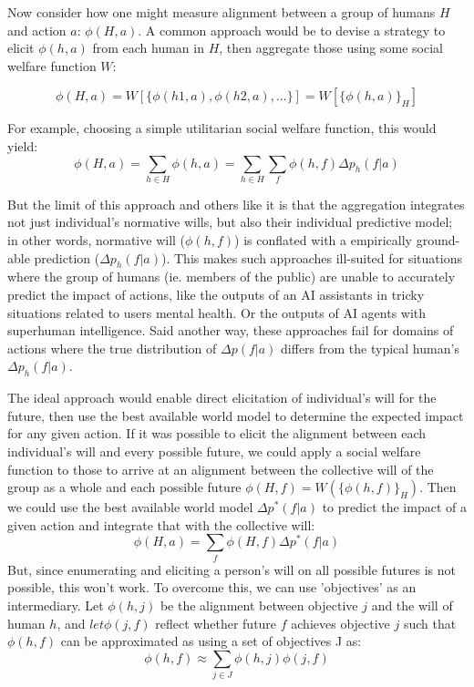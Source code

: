 \documentclass{article}
\begin{document}
Now consider how one might measure alignment between a group of humans $H$ and action $a$: $\phi(H,a)$. A common approach would be to devise a strategy to elicit $\phi(h,a)$ from each human in $H$, then aggregate those using some social welfare function $W$:

\begin{equation}
    \phi(H,a) = W[\{\phi(h1,a),\phi(h2,a),...\}] =W[\{\phi(h,a)\}_H]
\end{equation}

For example, choosing a simple utilitarian social welfare function, this would yield:
\begin{equation}
    \phi(H,a) = \sum\limits_{h\in H} \phi(h,a) = \sum\limits_{h\in H} \sum \limits_{f}\phi(h,f)\Delta p_h(f|a) 
\end{equation}

But the limit of this approach and others like it is that the aggregation integrates not just individual's normative wills, but also their individual predictive model; in other words, normative will ($\phi(h,f)$) is conflated with a empirically ground-able prediction ($\Delta p_h(f|a)$). This makes such approaches ill-suited for situations where the group of humans (ie. members of the public) are unable to accurately predict the impact of actions, like the outputs of an AI assistants in tricky situations related to users mental health. Or the outputs of AI agents with superhuman intelligence. Said another way, these approaches fail for domains of actions where the true distribution of $\Delta p(f|a)$ differs from the typical human's $\Delta p_h(f|a)$.

The ideal approach would enable direct elicitation of individual's will for the future, then use the best available world model to determine the expected impact for any given action. If it was possible to elicit the alignment between each individual's will and every possible future, we could apply a social welfare function to those to arrive at an alignment between the collective will of the group as a whole and each possible future $\phi(H,f)=W(\{\phi(h,f)\}_H)$. Then we could use the best available world model $\Delta p^*(f|a)$ to predict the impact of a given action and integrate that with the collective will:
\begin{equation}
    \phi(H,a) = \sum \limits_{f}\phi(H,f)\Delta p^*(f|a) 
\end{equation}
But, since enumerating and eliciting a person's will on all possible futures is not possible, this won't work. To overcome this, we can use 'objectives' as an intermediary. Let $\phi(h,j)$ be the alignment between objective $j$ and the will of human $h$, and $let \phi(j,f)$ reflect whether future $f$ achieves objective $j$ such that $\phi(h,f)$ can be approximated as using a set of objectives J as:
\begin{equation}
    \phi(h,f) \approx \sum\limits_{j\in J}\phi(h,j)\phi(j,f)
\end{equation}
\end{document}
